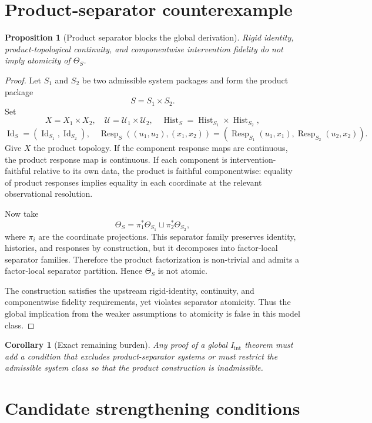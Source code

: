 \documentclass[11pt]{article}
\newtheorem{proposition}[definition]{Proposition}
\newtheorem{corollary}[definition]{Corollary}
\newcommand{\Id}{\operatorname{Id}}
\newcommand{\Hist}{\operatorname{Hist}}
\newcommand{\Resp}{\operatorname{Resp}}
\begin{document}
\section{Product-separator counterexample}

\begin{proposition}[Product separator blocks the global derivation]
Rigid identity, product-topological continuity, and componentwise intervention fidelity do not imply atomicity of $\Theta_S$.
\end{proposition}

\begin{proof}
Let $S_1$ and $S_2$ be two admissible system packages and form the product package
\[
  S = S_1\times S_2.
\]
Set
\[
  X=X_1\times X_2,
  \quad
  \mathcal U=\mathcal U_1\times\mathcal U_2,
  \quad
  \Hist_S=\Hist_{S_1}\times\Hist_{S_2},
\]
\[
  \Id_S=(\Id_{S_1},\Id_{S_2}),
  \quad
  \Resp_S((u_1,u_2),(x_1,x_2))=(\Resp_{S_1}(u_1,x_1),\Resp_{S_2}(u_2,x_2)).
\]
Give $X$ the product topology. If the component response maps are continuous, the product response map is continuous. If each component is intervention-faithful relative to its own data, the product is faithful componentwise: equality of product responses implies equality in each coordinate at the relevant observational resolution.

Now take
\[
  \Theta_S = \pi_1^*\Theta_{S_1}\sqcup \pi_2^*\Theta_{S_2},
\]
where $\pi_i$ are the coordinate projections. This separator family preserves identity, histories, and responses by construction, but it decomposes into factor-local separator families. Therefore the product factorization is non-trivial and admits a factor-local separator partition. Hence $\Theta_S$ is not atomic.

The construction satisfies the upstream rigid-identity, continuity, and componentwise fidelity requirements, yet violates separator atomicity. Thus the global implication from the weaker assumptions to atomicity is false in this model class.
\end{proof}

\begin{corollary}[Exact remaining burden]
Any proof of a global $I_{\mathrm{int}}$ theorem must add a condition that excludes product-separator systems or must restrict the admissible system class so that the product construction is inadmissible.
\end{corollary}

\section{Candidate strengthening conditions}
\end{document}
